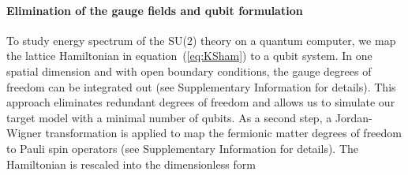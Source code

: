 \documentclass[twocolumn,aps,showpacs,prb,superscriptaddress,floatfix,10pt,nofootinbib]{revtex4-2}
\renewcommand{\eqref}[1]{equation~(\ref{#1})}
\begin{document}
\paragraph{\textbf{Elimination of the gauge fields and qubit formulation}}
To study energy spectrum of the SU(2) theory on a quantum computer, we map the lattice Hamiltonian in \eqref{eq:KSham} to a qubit system. In one spatial dimension and with open boundary conditions, the gauge degrees of freedom can be integrated out \cite{hamer_lattice_1977,ligterink_toward_2000,banuls_efficient_2017,sala_variational_2018,zohar_removing_2019} (see Supplementary Information for details).
This approach eliminates redundant degrees of freedom and allows us to simulate our target model with a minimal number of qubits. As a second step, a Jordan-Wigner transformation is applied to map the fermionic matter degrees of freedom to Pauli spin operators (see Supplementary Information for details).
The Hamiltonian is rescaled into the dimensionless form
\end{document}

